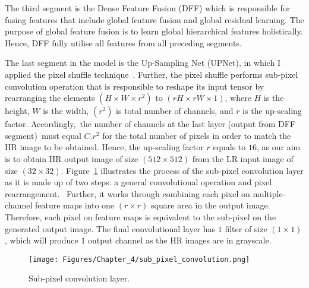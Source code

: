 The third segment is the Dense Feature Fusion (DFF) which is responsible for fusing features that include global feature fusion and global residual learning.
The purpose of global feature fusion is to learn global hierarchical features holistically.
Hence, DFF fully utilise all features from all preceding segments.

The last segment in the model is the Up-Sampling Net (UPNet), in which I applied the pixel shuffle technique~\cite{Shi2016}.
Further, the pixel shuffle performs sub-pixel convolution operation that is responsible to reshape its input tensor by rearranging the elements \((H\times W\times r^2)\) to \((rH\times rW\times 1)\), where \(H\) is the height, \(W\) is the width, \((r^2)\) is total number of channels, and \(r\) is the up-scaling factor.
Accordingly, the number of channels at the last layer (output from DFF segment) must equal \(C.r^2\) for the total number of pixels in order to match the HR image to be obtained.
Hence, the up-scaling factor \(r\) equals to \(16\), as our aim is to obtain HR output image of size \((512\times 512)\) from the LR input image of size \((32\times 32)\).
Figure~\ref{fig:sub_pixel_layer} illustrates the process of the sub-pixel convolution layer as it is made up of two steps: a general convolutional operation and pixel rearrangement. 
Further, it works through combining each pixel on multiple-channel feature maps into one \((r\times r)\) square area in the output image. 
Therefore, each pixel on feature maps is equivalent to the sub-pixel on the generated output image.
The final convolutional layer has \(1\) filter of size \((1\times 1)\), which will produce \(1\) output channel as the HR images are in grayscale. 
\begin{figure} [h!]
	\begin{center}
		\texttt{[image: Figures/Chapter\_4/sub\_pixel\_convolution.png]}
	\end{center}
	\caption{Sub-pixel convolution layer.} 
	\label{fig:sub_pixel_layer}
\end{figure}
\newpage